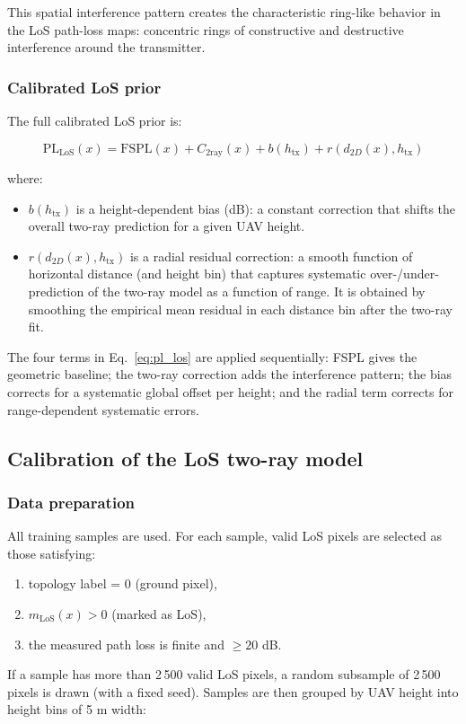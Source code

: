 \documentclass[11pt,a4paper]{article}
\begin{document}
This spatial interference pattern creates the characteristic ring-like
behavior in the LoS path-loss maps: concentric rings of constructive and
destructive interference around the transmitter.

\subsubsection{Calibrated LoS prior}

The full calibrated LoS prior is:

\begin{equation}
\mathrm{PL}_{\mathrm{LoS}}(x)
=
\mathrm{FSPL}(x)
+ C_{\mathrm{2ray}}(x)
+ b(h_{\mathrm{tx}})
+ r(d_{2D}(x), h_{\mathrm{tx}})
\label{eq:pl_los}
\end{equation}

where:
\begin{itemize}
\item $b(h_{\mathrm{tx}})$ is a height-dependent bias (dB): a constant
      correction that shifts the overall two-ray prediction for a given UAV
      height.
\item $r(d_{2D}(x), h_{\mathrm{tx}})$ is a radial residual correction: a
      smooth function of horizontal distance (and height bin) that captures
      systematic over-/under-prediction of the two-ray model as a function of
      range. It is obtained by smoothing the empirical mean residual in each
      distance bin after the two-ray fit.
\end{itemize}

The four terms in Eq.~\eqref{eq:pl_los} are applied sequentially:
FSPL gives the geometric baseline; the two-ray correction adds the
interference pattern; the bias corrects for a systematic global offset per
height; and the radial term corrects for range-dependent systematic errors.

\subsection{Calibration of the LoS two-ray model}
\label{sec:los_calibration}

\subsubsection{Data preparation}

All training samples are used. For each sample, valid LoS pixels are selected
as those satisfying:
\begin{enumerate}
\item topology label = 0 (ground pixel),
\item $m_{\mathrm{LoS}}(x) > 0$ (marked as LoS),
\item the measured path loss is finite and $\ge 20$ dB.
\end{enumerate}
If a sample has more than 2\,500 valid LoS pixels, a random subsample of
2\,500 pixels is drawn (with a fixed seed). Samples are then grouped by UAV
height into height bins of 5 m width:
\end{document}
